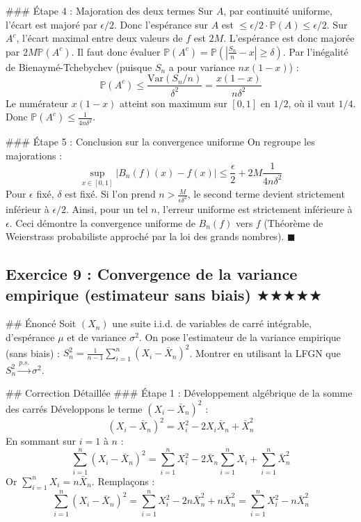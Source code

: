 \documentclass[11pt,a4paper]{article}
\begin{document}
\#\#\# Étape 4 : Majoration des deux termes
Sur $A$, par continuité uniforme, l'écart est majoré par $\epsilon/2$. Donc l'espérance sur $A$ est $\le \epsilon/2 \cdot \mathbb{P}(A) \le \epsilon/2$.
Sur $A^c$, l'écart maximal entre deux valeurs de $f$ est $2M$. L'espérance est donc majorée par $2M \mathbb{P}(A^c)$.
Il faut donc évaluer $\mathbb{P}(A^c) = \mathbb{P}\left( \left| \frac{S_n}{n} - x \right| \ge \delta \right)$.
Par l'inégalité de Bienaymé-Tchebychev (puisque $S_n$ a pour variance $nx(1-x)$) :
$$ \mathbb{P}(A^c) \le \frac{\text{Var}(S_n/n)}{\delta^2} = \frac{x(1-x)}{n \delta^2} $$
Le numérateur $x(1-x)$ atteint son maximum sur $[0,1]$ en $1/2$, où il vaut $1/4$.
Donc $\mathbb{P}(A^c) \le \frac{1}{4n\delta^2}$.

\#\#\# Étape 5 : Conclusion sur la convergence uniforme
On regroupe les majorations :
$$ \sup_{x \in [0,1]} |B_n(f)(x) - f(x)| \le \frac{\epsilon}{2} + 2M \frac{1}{4n\delta^2} $$
Pour $\epsilon$ fixé, $\delta$ est fixé. Si l'on prend $n > \frac{M}{\epsilon \delta^2}$, le second terme devient strictement inférieur à $\epsilon/2$.
Ainsi, pour un tel $n$, l'erreur uniforme est strictement inférieure à $\epsilon$.
Ceci démontre la convergence uniforme de $B_n(f)$ vers $f$ (Théorème de Weierstrass probabiliste approché par la loi des grands nombres). $\blacksquare$


\subsection*{Exercice 9 : Convergence de la variance empirique (estimateur sans biais) \quad $\bigstar\bigstar\bigstar\bigstar\bigstar$}

\#\# Énoncé
Soit $(X_n)$ une suite i.i.d. de variables de carré intégrable, d'espérance $\mu$ et de variance $\sigma^2$.
On pose l'estimateur de la variance empirique (sans biais) : $S_n^2 = \frac{1}{n-1} \sum_{i=1}^n (X_i - \bar{X}_n)^2$.
Montrer en utilisant la LFGN que $S_n^2 \xrightarrow{p.s.} \sigma^2$.

\#\# Correction Détaillée
\#\#\# Étape 1 : Développement algébrique de la somme des carrés
Développons le terme $(X_i - \bar{X}_n)^2$ :
$$ (X_i - \bar{X}_n)^2 = X_i^2 - 2X_i \bar{X}_n + \bar{X}_n^2 $$
En sommant sur $i=1$ à $n$ :
$$ \sum_{i=1}^n (X_i - \bar{X}_n)^2 = \sum_{i=1}^n X_i^2 - 2\bar{X}_n \sum_{i=1}^n X_i + \sum_{i=1}^n \bar{X}_n^2 $$
Or $\sum_{i=1}^n X_i = n \bar{X}_n$. Remplaçons :
$$ \sum_{i=1}^n (X_i - \bar{X}_n)^2 = \sum_{i=1}^n X_i^2 - 2n \bar{X}_n^2 + n \bar{X}_n^2 = \sum_{i=1}^n X_i^2 - n \bar{X}_n^2 $$
\end{document}

